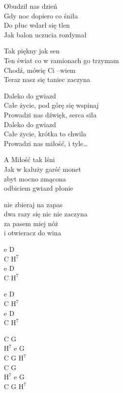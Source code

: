 \begin{text}
Obudził nas dzień\\
Gdy noc dopiero co śniła\\
Do płuc wdarł się tlen\\
Jak balon uczucia rozdymał

Tak piękny jak sen\\
Ten świat co w ramionach go trzymam\\
Chodź, mówię Ci –wiem\\
Teraz nasz się taniec zaczyna

\vin Daleko do gwiazd\\
\vin Całe życie, pod górę się wspinaj\\
\vin Prowadzi nas dźwięk, serca siła\\
\vin Daleko do gwiazd\\
\vin Całe życie, krótka to chwila\\
\vin Prowadzi nas miłość, i tyle…

A Miłość tak lśni\\
Jak w kałuży garść monet\\
zbyt mocno zmącona\\
odbiciem gwiazd płonie

nie zbieraj na zapas\\
dwa razy się nic nie zaczyna\\
za pasem miej nóż\\
i otwieracz do wina
\end{text}
\begin{chord}
    e D\\
    C $\mathrm{H^7}$\\
    e D\\
    C $\mathrm{H^7}$

    e D\\
    C $\mathrm{H^7}$\\
    e D\\
    C $\mathrm{H^7}$

    C G\\
    $\mathrm{H^7}$ e G\\
    C G $\mathrm{H^7}$\\
    C G\\
    $\mathrm{H^7}$ e G\\
    C G $\mathrm{H^7}$
\end{chord}
